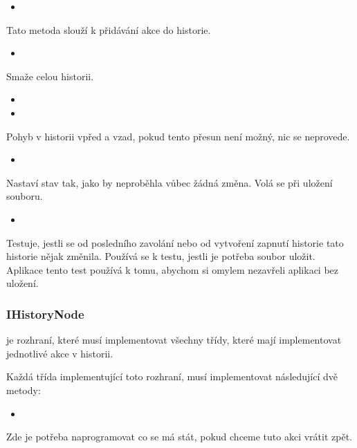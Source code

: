 \documentclass[
  field=inf,
  biblatex,
  glossaries,
  index
]{kidiplom}
\begin{document}
\begin{itemize}
\item {}
\end{itemize}
Tato metoda slouží k přidávání akce do historie.

\begin{itemize}
\item {}
\end{itemize}
Smaže celou historii.

\begin{itemize}
\item {}
\item {}
\end{itemize}
Pohyb v historii vpřed a vzad, pokud tento přesun není možný, nic se neprovede.

\begin{itemize}
\item {}
\end{itemize}
Nastaví stav tak, jako by neproběhla vůbec žádná změna. Volá se při uložení souboru.

\begin{itemize}
\item {}
\end{itemize}
Testuje, jestli se od posledního zavolání  nebo od vytvoření zapnutí historie tato historie nějak změnila. Používá se k testu, jestli je potřeba soubor uložit. Aplikace tento test používá k tomu, abychom si omylem nezavřeli aplikaci bez uložení.

\subsubsection{IHistoryNode}
 je rozhraní, které musí implementovat všechny třídy, které mají implementovat jednotlivé akce v historii.

Každá třída implementující toto rozhraní, musí implementovat následující dvě metody:

\begin{itemize}
\item {}
\end{itemize}
Zde je potřeba naprogramovat co se má stát, pokud chceme tuto akci vrátit zpět.
\end{document}
